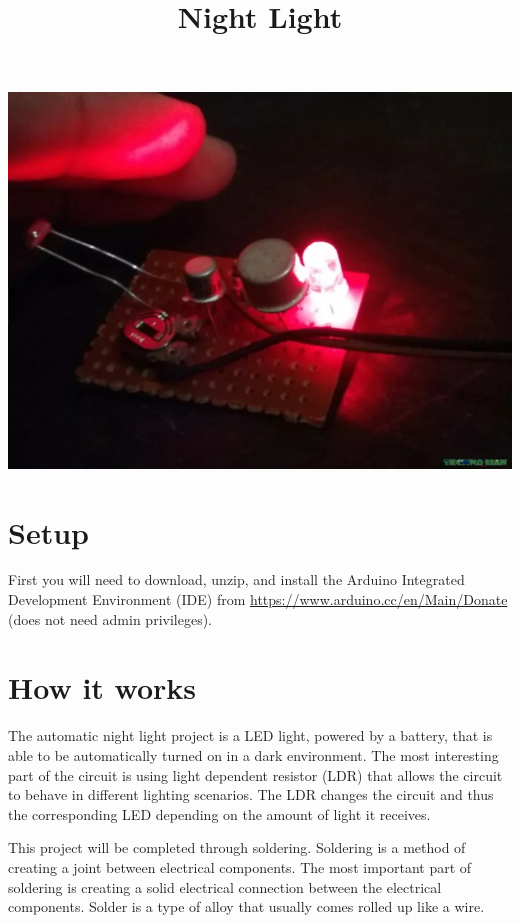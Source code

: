 \documentclass[11pt]{article}
\date{}
\title{Night Light}
\begin{document}
\maketitle

\centerline{
	\includegraphics[scale=.75]{exp11-board}	
}

\section{Setup}
\label{sec-1}

First you will need to download, unzip, and install the Arduino Integrated Development Environment (IDE) from
\url{https://www.arduino.cc/en/Main/Donate} (does not need admin privileges).

\section{How it works}
\label{sec-2}
The automatic night light project is a LED light, powered by a battery, that is able to be automatically turned on in a dark environment. The most interesting part of the circuit is using light dependent resistor (LDR) that allows the circuit to behave in different lighting scenarios. The LDR changes the circuit and thus the corresponding LED depending on the amount of light it receives.

This project will be completed through soldering. Soldering is a method of creating a joint between electrical components. The most important part of soldering is creating a solid electrical connection between the electrical components. Solder is a type of alloy that usually comes rolled up like a wire. 
\end{document}

